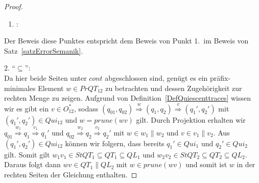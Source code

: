 \begin{proof}
  ~
  \begin{enumerate}
    \item \hspace{-0.2cm}:
  \end{enumerate}
  \vspace{-0.3cm}
  Der Beweis diese Punktes entspricht dem Beweis von Punkt 1.\ im Beweis von
  Satz~\ref{satzErrorSemanik}.

  2. ``$\subseteq$'':\\
  Da hier beide Seiten unter $cont$ abgeschlossen sind, genügt es ein
  präfix-minimales Element $w\in PrQT_{12}$ zu betrachten und dessen
  Zugehörigkeit zur rechten Menge zu zeigen. Aufgrund von
  Definition~\ref{DefQuiescenttraces} wissen wir es gibt ein $v\in O_{12}^*$,
  sodass $(q_{01},q_{02}) \overset{w}{\Rightarrow} (q_1,q_2)
  \overset{v}{\Rightarrow} (q_1',q_2')$ mit $(q_1',q_2')\in Qui_{12}$ und
  $w=prune(wv)$ gilt. Durch Projektion erhalten wir $q_{01}
  \overset{w_1}{\Rightarrow} q_1 \overset{v_1}{\Rightarrow} q_1'$ und $q_{02}
  \overset{w_2}{\Rightarrow} q_2 \overset{v_2}{\Rightarrow} q_2'$ mit $w\in
  w_1\|w_2$ und $v\in v_1\|v_2$. Aus $(q_1',q_2')\in Qui_{12}$ können wir
  folgern, dass bereits $q_1'\in Qui_1$ und $q_2'\in Qui_2$ gilt. Somit gilt
  $w_1v_1\in StQT_1\subseteq QT_1\subseteq QL_1$ und $w_2v_2\in StQT_2\subseteq
  QT_2\subseteq QL_2$. Daraus folgt dann $wv\in QT_1\|QL_2$ mit $w\in
  prune(wv)$ und somit ist $w$ in der rechten Seiten der Gleichung enthalten.


\end{proof}
